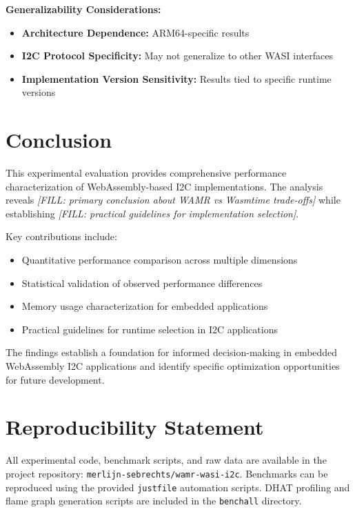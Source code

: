 \textbf{Generalizability Considerations:}
\begin{itemize}
    \item \textbf{Architecture Dependence:} ARM64-specific results
    \item \textbf{I2C Protocol Specificity:} May not generalize to other WASI interfaces
    \item \textbf{Implementation Version Sensitivity:} Results tied to specific runtime versions
\end{itemize}

\section{Conclusion}
\label{sec:eval-conclusion}

This experimental evaluation provides comprehensive performance characterization of WebAssembly-based I2C implementations. The analysis reveals \textit{[FILL: primary conclusion about WAMR vs Wasmtime trade-offs]} while establishing \textit{[FILL: practical guidelines for implementation selection]}.

Key contributions include:
\begin{itemize}
    \item Quantitative performance comparison across multiple dimensions
    \item Statistical validation of observed performance differences  
    \item Memory usage characterization for embedded applications
    \item Practical guidelines for runtime selection in I2C applications
\end{itemize}

The findings establish a foundation for informed decision-making in embedded WebAssembly I2C applications and identify specific optimization opportunities for future development.

\section*{Reproducibility Statement}
\label{sec:reproducibility}

All experimental code, benchmark scripts, and raw data are available in the project repository: \texttt{merlijn-sebrechts/wamr-wasi-i2c}. Benchmarks can be reproduced using the provided \texttt{justfile} automation scripts. DHAT profiling and flame graph generation scripts are included in the \texttt{benchall} directory.

